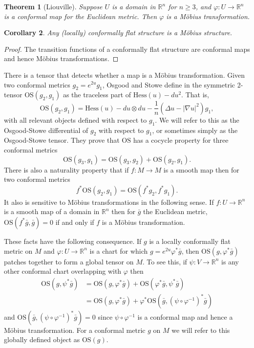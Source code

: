 \documentclass{amsart}
\newcommand{\R}{\mathbb{R}}
\newtheorem{thm}{Theorem}[section]
\newtheorem{cor}[thm]{Corollary}
\numberwithin{equation}{section}
\begin{document}
\begin{thm}[Liouville]
Suppose $U$ is a domain in $\R^n$ for $n \geq 3$, and $\varphi: U \to \R^n$ is a conformal map for the Euclidean metric. Then $\varphi$ is a M\"obius transformation.
\end{thm}
 

\begin{cor}
Any (locally) conformally flat structure is a M\"obius structure. 
\end{cor}
\begin{proof}
The transition functions of a conformally flat structure are conformal maps and hence M\"obius transformations.
\end{proof}

There is a tensor that detects whether a map is a M\"obius transformation. 
Given two conformal metrics $g_2 = e^{2u}g_1$, Osgood and Stowe define in \cite{Osgood-Stowe1992} the symmetric 2-tensor $\mathrm{OS}(g_2,g_1)$ as the traceless part of $\mathrm{Hess}(u) - du^2$.
That is, 
\[
\mathrm{OS}(g_2,g_1) = \mathrm{Hess}(u)  - du\otimes du - \frac{1}{n}\left( \Delta u - |\nabla u|^2\right)g_1,
\]
with all relevant objects defined with respect to $g_1$.
We will refer to this as the Osgood-Stowe differential of $g_2$ with respect to $g_1$, or sometimes simply as the Osgood-Stowe tensor.
They prove that $\mathrm{OS}$ has a cocycle property for three conformal metrics
\[
\mathrm{OS}(g_3,g_1) = \mathrm{OS}(g_3,g_2) + \mathrm{OS}(g_2,g_1).
\]
There is also a naturality property that if $f: M \to M$ is a smooth map then for two conformal metrics
\[
f^*\mathrm{OS}(g_2,g_1) = \mathrm{OS}(f^*g_2,f^*g_1).
\]
It also is sensitive to M\"obius transformations in the following sense. 
If $f:U \to \R^n$ is a smooth map of a domain in $\R^n$ then for $\bar{g}$ the Euclidean metric, $\mathrm{OS}(f^*\bar{g},\bar{g}) = 0$ if and only if $f$ is a M\"obius transformation.

These facts have the following consequence. 
If $g$ is a locally conformally flat metric on $M$ and $\varphi: U \to \R^n$ is a chart for which $g = e^{2u}\varphi^*\bar{g}$, then $\mathrm{OS}(g, \varphi^*\bar{g})$ patches together to form a global tensor on $M$. 
To see this, if $\psi: V \to \R^n$ is any other conformal chart overlapping with $\varphi$ then 
\begin{align*}
\mathrm{OS}(g ,\psi^*\bar{g}) 
&= \mathrm{OS}(g, \varphi^*\bar{g}) + \mathrm{OS}(\varphi^*\bar{g},\psi^*\bar{g}) \\
&= \mathrm{OS}(g, \varphi^*\bar{g}) + \varphi^*\mathrm{OS}(\bar{g},(\psi \circ \varphi^{-1})^*\bar{g})
\end{align*}
and $\mathrm{OS}(\bar{g},(\psi \circ \varphi^{-1})^*\bar{g}) = 0$ since $\psi \circ \varphi^{-1}$ is a conformal map and hence a M\"obius transformation.
For a conformal metric $g$ on $M$ we will refer to this globally defined object as $\mathrm{OS}(g)$.
\end{document}
